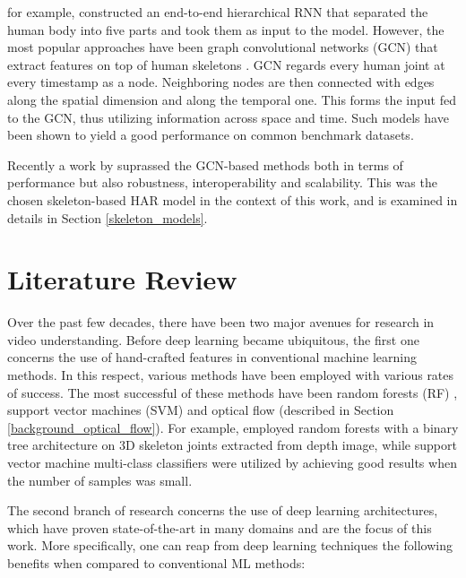 \documentclass[extern,palatino]{cgMA}
\begin{document}
\cite{du2015hierarchical} for example, constructed an end-to-end hierarchical RNN that separated the human body into five parts and took them as input to the model. However, the most popular approaches have been graph convolutional networks (GCN) that extract features on top of human skeletons \cite{yan2018spatial}. GCN regards every human joint at every timestamp as a node. Neighboring nodes are then connected with edges along the spatial dimension and along the temporal one. This forms the input fed to the GCN, thus utilizing information across space and time. Such models have been shown to yield a good performance on common benchmark datasets.

Recently a work by \cite{duan2021revisiting} suprassed the GCN-based methods both in terms of performance but also robustness, interoperability and scalability. This was the chosen skeleton-based HAR model in the context of this work, and is examined in details in Section \ref{skeleton_models}.


\newpage
\section{Literature Review}
\label{literature_review}

Over the past few decades, there have been two major avenues for research in video understanding. Before deep learning became ubiquitous, the first one concerns the use of hand-crafted features in conventional machine learning methods. In this respect, various methods have been employed with various rates of success. The most successful of these methods have been random forests (RF) \cite{breiman2001random}, support vector machines (SVM) \cite{cortes1995support} and optical flow (described in Section \ref{background_optical_flow}). For example, \cite{gan2013human} employed random forests with a binary tree architecture on 3D skeleton joints extracted from depth image, while support vector machine multi-class classifiers were utilized by \cite{qian2010recognition} achieving good results when the number of samples was small. 

The second branch of research concerns the use of deep learning architectures, which have proven state-of-the-art in many domains and are the focus of this work. More specifically, one can reap from deep learning techniques the following benefits when compared to conventional ML methods:
\end{document}
